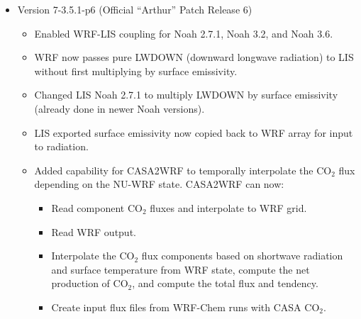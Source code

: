 \begin{itemize}
\item Version 7-3.5.1-p6 (Official ``Arthur'' Patch Release 6)
  \begin{itemize}
    \item Enabled WRF-LIS coupling for Noah 2.7.1, Noah 3.2, and Noah 3.6.
    \item WRF now passes pure LWDOWN (downward longwave radiation) to LIS
      without first multiplying by surface emissivity.
    \item Changed LIS Noah 2.7.1 to multiply LWDOWN by surface emissivity 
      (already done in newer Noah versions).
    \item LIS exported surface emissivity now copied back to WRF array for
      input to radiation.
    \item Added capability for CASA2WRF to temporally interpolate the CO$_2$
      flux depending on the NU-WRF state.  CASA2WRF can now:
      \begin{itemize}
        \item Read component CO$_2$ fluxes and interpolate to WRF
          grid.
        \item Read WRF output.
        \item Interpolate the CO$_2$ flux components based on shortwave
          radiation and surface temperature from WRF state, compute the
          net production of CO$_2$, and compute the total flux and tendency.
        \item Create input flux files from WRF-Chem runs with CASA CO$_2$.
      \end{itemize}
  \end{itemize}


\end{itemize}
